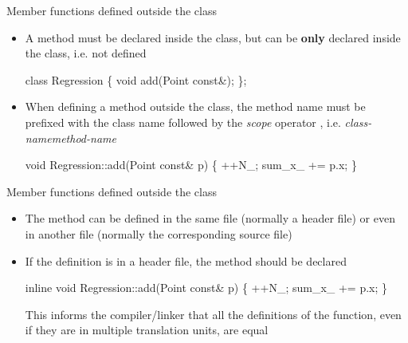 \begin{frame}[fragile]{Member functions defined outside the class}

  \begin{itemize}

  \item A method must be declared inside the class, but can be \textbf{only}
    declared inside the class, i.e. not defined

    \begin{codeblock}
class Regression \{
  \ddd
  void add(Point const&);
\};\end{codeblock}

  \item When defining a method outside the class, the method name must be
    prefixed with the class name followed by the \textit{scope} operator
    \code{::}, i.e. \textit{class-name}\code{::}\textit{method-name}

    \begin{codeblock}
void Regression::add(Point const& p) \{
  ++N_;
  sum_x_ += p.x;
  \ddd
\}\end{codeblock}

  \end{itemize}

\end{frame}

\begin{frame}[fragile]{Member functions defined outside the class \insertcontinuationtext}

  \begin{itemize}
  \item The method can be defined in the same file (normally a header file) or
    even in another file (normally the corresponding source file)

  \item If the definition is in a header file, the method should be declared 

    \begin{codeblock}
\alert{inline} void Regression::add(Point const& p) \{
  ++N_;
  sum_x_ += p.x;
  \ddd
\}\end{codeblock}

    This informs the compiler/linker that all the definitions of the function, even
    if they are in multiple translation units, are equal

  \end{itemize}

\end{frame}

